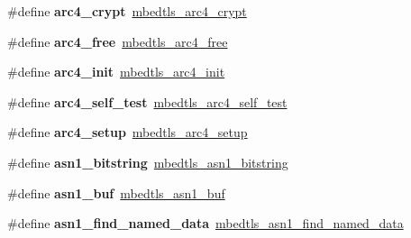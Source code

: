 \begin{DoxyCompactItemize}
\item 
\mbox{\label{compat-1_83_8h_af9ed5a309fbb51975d454044a2caf4ad}} 
\#define {\bfseries arc4\+\_\+crypt}~\mbox{\hyperlink{arc4_8h_a51d378246f0c277a68352cdac782e8fb}{mbedtls\+\_\+arc4\+\_\+crypt}}
\item 
\mbox{\label{compat-1_83_8h_a3c1caa19bc687a5f577feaf72088de87}} 
\#define {\bfseries arc4\+\_\+free}~\mbox{\hyperlink{arc4_8h_a888a4167caf8503e9e82a132c7b89313}{mbedtls\+\_\+arc4\+\_\+free}}
\item 
\mbox{\label{compat-1_83_8h_a9f089c9000c9e9c00d62d32327d501c8}} 
\#define {\bfseries arc4\+\_\+init}~\mbox{\hyperlink{arc4_8h_a7795c92c7a8a4b9cf715da081665ccfd}{mbedtls\+\_\+arc4\+\_\+init}}
\item 
\mbox{\label{compat-1_83_8h_a3cd097593b8b29bd3864673e98463d9f}} 
\#define {\bfseries arc4\+\_\+self\+\_\+test}~\mbox{\hyperlink{arc4_8h_aba830fee9057fa1c63dcc38c7caf7730}{mbedtls\+\_\+arc4\+\_\+self\+\_\+test}}
\item 
\mbox{\label{compat-1_83_8h_ab708989302fb74122e1f7b0c19e01e3e}} 
\#define {\bfseries arc4\+\_\+setup}~\mbox{\hyperlink{arc4_8h_a6a689a989cb433e41181caef8d8bf4ba}{mbedtls\+\_\+arc4\+\_\+setup}}
\item 
\mbox{\label{compat-1_83_8h_a052b9500b1594e15085bb9cfc29f588b}} 
\#define {\bfseries asn1\+\_\+bitstring}~\mbox{\hyperlink{structmbedtls__asn1__bitstring}{mbedtls\+\_\+asn1\+\_\+bitstring}}
\item 
\mbox{\label{compat-1_83_8h_ad6fa2bb02f1aee2e4a8f0f76203b3273}} 
\#define {\bfseries asn1\+\_\+buf}~\mbox{\hyperlink{structmbedtls__asn1__buf}{mbedtls\+\_\+asn1\+\_\+buf}}
\item 
\mbox{\label{compat-1_83_8h_a1a4ad756a2b0e8ffbe099c5d1656d21f}} 
\#define {\bfseries asn1\+\_\+find\+\_\+named\+\_\+data}~\mbox{\hyperlink{asn1_8h_aabe93ade4a012da5d20cf668eededa75}{mbedtls\+\_\+asn1\+\_\+find\+\_\+named\+\_\+data}}
\item 
\mbox{\label{compat-1_83_8h_afc04b01befe45a4da102894cf4141492}} 

\end{DoxyCompactItemize}
